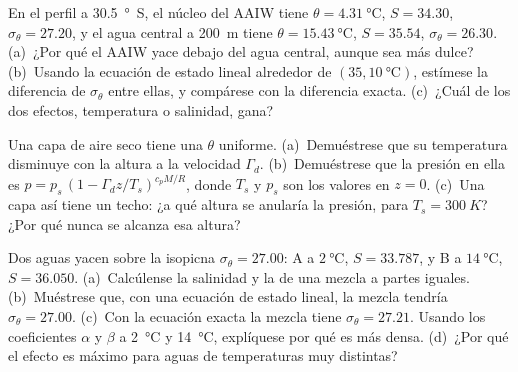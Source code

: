 \begin{exercise}[$\star\star$]\label{exo:b1:fluid-envelopes-structure:9}
En el perfil a \qty{30.5}{\degree S}, el núcleo del AAIW tiene $\theta =
\qty{4.31}{\celsius}$, $S = 34.30$, $\sigma_\theta = 27.20$, y el agua central a \qty{200}{m} tiene $\theta = \qty{15.43}{\celsius}$, $S = 35.54$,
$\sigma_\theta = 26.30$. (a)~¿Por qué el AAIW yace debajo del agua central, aunque sea más dulce? (b)~Usando la ecuación de estado lineal alrededor de
$(35, \qty{10}{\celsius})$, estímese la diferencia de $\sigma_\theta$ entre ellas, y compárese con la diferencia exacta. (c)~¿Cuál de los dos efectos, temperatura o salinidad, gana?
\end{exercise}

\begin{exercise}[$\star\star\star$]\label{exo:b1:fluid-envelopes-structure:10}
Una capa de aire seco tiene una  $\theta$ uniforme. (a)~Demuéstrese que su temperatura disminuye con la altura a la velocidad $\Gamma_d$. (b)~Demuéstrese que la presión en ella es $p = p_s\,(1 - \Gamma_d z/T_s)^{c_pM/R}$, donde $T_s$ y $p_s$ son los valores en $z = 0$. (c)~Una capa así tiene un techo: ¿a qué altura se anularía la presión, para $T_s = \qty{300}{K}$? ¿Por qué nunca se alcanza esa altura?
\end{exercise}

\begin{exercise}[$\star\star\star$]\label{exo:b1:fluid-envelopes-structure:11}
Dos aguas yacen sobre la isopicna $\sigma_\theta = 27.00$: A a
$\qty{2}{\celsius}$, $S = 33.787$, y B a $\qty{14}{\celsius}$, $S = 36.050$.
(a)~Calcúlense la salinidad y la  de una mezcla a partes iguales. (b)~Muéstrese que, con una ecuación de estado lineal, la mezcla tendría
$\sigma_\theta = 27.00$. (c)~Con la ecuación exacta la mezcla tiene
$\sigma_\theta = 27.21$. Usando los coeficientes $\alpha$ y $\beta$ a \qty{2}{\celsius}
y \qty{14}{\celsius}, explíquese por qué es más densa. (d)~¿Por qué el efecto es máximo para aguas de temperaturas muy distintas?
\end{exercise}

